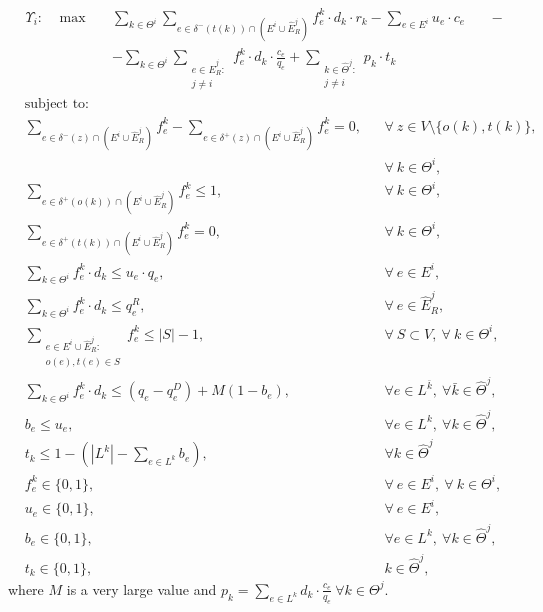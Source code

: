 \documentclass{article}
\begin{document}
    \begin{align}
        &  \Upsilon_i: \hspace{10pt} \max  &&  \sum_{k\in \Theta^i} \sum_{e \in \delta^-(t(k))\cap (E^i\cup \widehat{E}_R^j)} f_e^k \cdot d_k \cdot r_k - \sum_{e\in E^i} u_e\cdot c_e \hspace{20pt} -  \nonumber  \label{eq:IterativeA}\\
        & 								  && - \sum_{k \in \Theta^i} \sum_{\substack{e \in \widehat{E}_R^j\colon \\ j\not = i}} f_e^k \cdot d_k \cdot \frac{c_e}{q_e}   + \sum_{\substack{k \in \widehat{\Theta}^j \colon \\j\not = i}} p_k \cdot t_k
    \end{align}
    \begin{align}
        & \text{subject to:}       && \nonumber\\
& \sum_{e \in \delta^-(z)\cap (E^i\cup \widehat{E}_R^j)} f_e^k-\sum_{e \in \delta^+(z)\cap (E^i\cup \widehat{E}_R^j)} f_{e}^k  = 0,                                   && \forall\ z\in V\setminus\{o(k),t(k)\},\nonumber\\[-1em]
& && \forall\ k\in\Theta^i,  \label{eq:IterativeB}\\[1em]
& \sum_{e \in \delta^+(o(k))\cap (E^i\cup \widehat{E}_R^j)} f_e^k  \leq 1, && \forall\ k\in \Theta^i, \label{eq:IterativeC} \\
& \sum_{e \in \delta^+(t(k))\cap (E^i\cup \widehat{E}_R^j)} f_e^k  = 0,  && \forall\ k\in \Theta^i, \label{eq:IterativeD} \\
& \sum_{k \in \Theta^i} f_e^k\cdot d_k \leq u_e\cdot q_e, && \forall\ e \in E^i, \label{eq:IterativeE}  \\
& \sum_{k \in \Theta^i} f_e^k\cdot d_k \leq  q_e^R, && \forall\ e \in \widehat{E}_R^j,\label{eq:IterativeF}  \\
& \sum_{\substack{e \in E^i\cup \widehat{E}_R^j\colon \\ o(e),t(e) \in S}}  f_e^k  \leq |S| -1, && \forall\ S \subset V,\ \forall\ k \in \Theta^i, \label{eq:IterativeG}\\
&\sum_{k\in \Theta^i} f_e^k \cdot d_k \leq (q_e - q_e^D) +M(1-b_e),\quad && \forall e \in L^{\bar{k}},\ \forall \bar{k} \in \widehat{\Theta}^j, \label{eq:IterativeH}\\
&b_e \leq u_e, && \forall e\in L^k,\ \forall k \in \widehat{\Theta}^j, \label{eq:IterativeI}\\[5pt]
& t_k \leq 1 -  (|L^k|-\sum_{e \in L^k} b_e), && \forall k \in \widehat{\Theta}^j \label{eq:IterativeJ}\\
& f_e^k  \in \{0,1\}, && \forall\ e \in E^i,\ \forall\ k \in \Theta^i, \label{eq:IterativeK} \\
&  u_e   \in \{0,1\},   && \forall\ e \in E^i,  \label{eq:IterativeL}\\
& b_e \in \{0,1\}, && \forall e \in L^k,\ \forall k\in \widehat{\Theta}^j,\label{eq:IterativeM}\\
& t_k \in \{0,1\}, && k \in \widehat{\Theta}^j, \label{eq:IterativeN}
    \end{align}
where $M$ is a very large value and $p_k=\sum_{e \in L^k} d_k\cdot \frac{c_e}{q_e}\ \forall k\in \Theta^j$.
\end{document}

